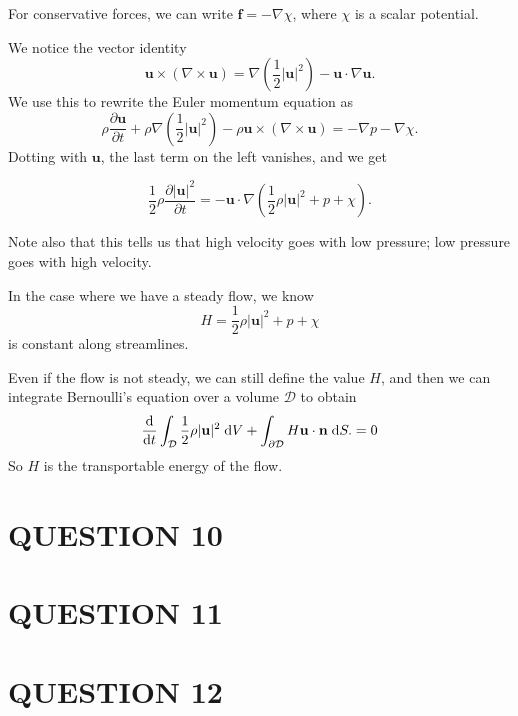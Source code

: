 \documentclass[a4paper]{article}
\begin{document}
For conservative forces, we can write $\mathbf{f} = -\nabla \chi$, where $\chi$ is a scalar potential.

We notice the vector identity
\[
\mathbf{u}\times (\nabla \times \mathbf{u}) = \nabla\left(\frac{1}{2}|\mathbf{u}|^2\right) - \mathbf{u}\cdot \nabla \mathbf{u}.
\]
We use this to rewrite the Euler momentum equation as
\[
\rho \frac{\partial \mathbf{u}}{\partial t} + \rho \nabla \left(\frac{1}{2}|\mathbf{u}|^2\right) - \rho \mathbf{u}\times (\nabla \times \mathbf{u}) = -\nabla p - \nabla \chi.
\]
Dotting with $\mathbf{u}$, the last term on the left vanishes, and we get
\begin{prop}
	\[
	\frac{1}{2}\rho \frac{\partial|\mathbf{u}|^2}{\partial t} = -\mathbf{u}\cdot \nabla \left(\frac{1}{2} \rho |\mathbf{u}|^2 + p + \chi\right).
	\]
\end{prop}
Note also that this tells us that high velocity goes with low pressure; low pressure goes with high velocity.

In the case where we have a steady flow, we know
\[
H = \frac{1}{2}\rho |\mathbf{u}|^2 + p + \chi
\]
is constant along streamlines.

Even if the flow is not steady, we can still define the value $H$, and then we can integrate Bernoulli's equation over a volume $\mathcal{D}$ to obtain
\[
\frac{\mathrm{d}}{\mathrm{d} t}\int_{\mathcal{D}} \frac{1}{2}\rho |\mathbf{u}|^2 \;\mathrm{d} V + \int_{\partial \mathcal{D}} H \mathbf{u}\cdot \mathbf{n} \;\mathrm{d} S. = 0 
\]
So $H$ is the transportable energy of the flow.




\section{QUESTION 10}







\section{QUESTION 11}
\section{QUESTION 12}
\end{document}
